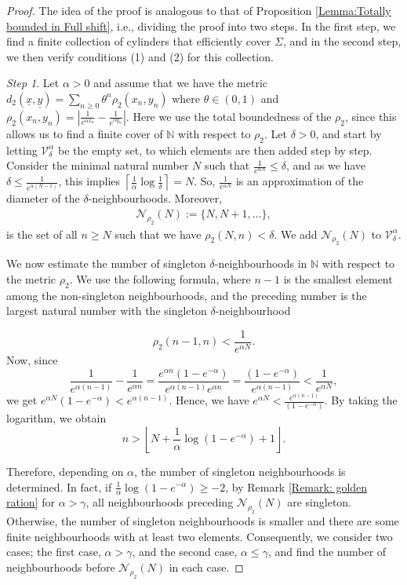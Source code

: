 \documentclass[11pt, reqno]{amsart}
\theoremstyle{plain}%
\theoremstyle{definition}
\theoremstyle{definition}
\def\N{\ensuremath{\mathbb N}}
\def\st{such that }
\def\ulx{\underline{x}}
\numberwithin{equation}{section}
\begin{document}
\begin{proof}
 The idea of the proof is analogous to that of Proposition \ref{Lemma:Totally bounded in Full shift}, i.e., dividing the proof into two steps. In the first step, we find a finite collection of cylinders that efficiently cover $\Sigma$, and in the second step, we then verify conditions (1) and (2) for this collection. 
 
\textit{Step 1}. Let $\alpha>0$ and assume that we have the metric $d_2(\ulx,\underline{y})=\sum_{n\ge 0} \theta^n  \rho_2(x_n, y_n)$ where $\theta\in(0,1)$ and $\rho_2(x_n, y_n) = \left| \frac{1}{e^{\alpha x_n}} - \frac{1}{e^{\alpha y_n}} \right|$. Here we use the total boundedness of the $\rho_2$, since this allows us to find a finite cover of $\N$ with respect to $\rho_2$. Let $\delta> 0$, and start by letting $\mathcal{V}_\delta^\alpha$ be the empty set, to which elements are then added step by step. Consider the minimal natural number $N$ \st $\frac{1}{e^{\alpha N}}\le \delta$, and as we have $\delta\le\frac{1}{e^{\alpha (N-1)}}$, this implies $\left\lceil\frac{1}{\alpha}\log\frac{1}{\delta}\right\rceil= N$. So, $\frac{1}{e^{\alpha N}}$ is an approximation of the diameter of the $\delta$-neighbourhoods. Moreover,
\begin{align}\label{Countable set of N d_2+}
    \mathcal{N}_{\rho_2}(N):=\{N,N+1,\ldots\},
\end{align}
is the set of all $n\ge N$ \st we have ${\rho_2}(N,n)<\delta$. We add $\mathcal{N}_{\rho_2}(N)$ to $\mathcal{V}_\delta^{\alpha}$.


We now estimate the number of singleton $\delta$-neighbourhoods in $\N$ with respect to the metric $\rho_2$. We use the following formula, where $n-1$ is the smallest element among the non-singleton neighbourhoods, and the preceding number is the largest natural number with the singleton $\delta$-neighbourhood

$$\rho_2(n-1,n)<\frac{1}{e^{\alpha N}}.$$
Now, since 
$$ \frac{1}{e^{\alpha(n-1)}}-\frac{1}{e^{\alpha n}}=\frac{e^{\alpha n}(1-e^{-\alpha})}{e^{\alpha (n-1)}e^{\alpha n}}=\frac{(1-e^{-\alpha})}{e^{\alpha (n-1)}}<\frac{1}{e^{\alpha N}},$$
we get $e^{\alpha N}(1-e^{-\alpha})<e^{\alpha (n-1)}$. Hence, we have $e^{\alpha N}<\frac{e^{\alpha (n-1)}}{(1-e^{-\alpha})}$. By taking the logarithm, we obtain
$$n>\left\lfloor N+\frac{1}{\alpha}\log(1-e^{-\alpha})+1  \right\rfloor.$$

 Therefore, depending on $\alpha$, the number of singleton neighbourhoods is determined. In fact, if $\frac{1}{\alpha}\log(1-e^{-\alpha})\ge-2$, by Remark \ref{Remark: golden ration} for $\alpha> \gamma$, all neighbourhoods preceding $\mathcal{N}_{\rho_2}(N)$ are singleton. Otherwise, the number of singleton neighbourhoods is smaller and there are some finite neighbourhoods with at least two elements. Consequently, we consider two cases; the first case, $\alpha>\gamma$, and the second case, $\alpha\le \gamma$, and find the number of neighbourhoods before $\mathcal{N}_{\rho_2}(N)$ in each case. 
 

\end{proof}
\end{document}
